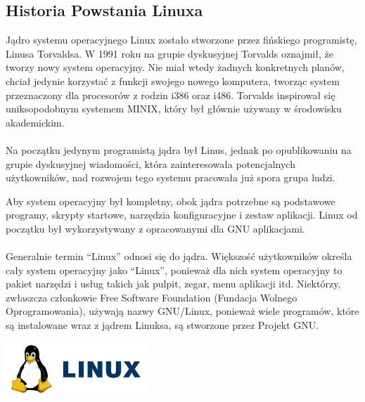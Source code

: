 \documentclass[10pt,a4paper]{report}
\begin{document}
\begin{adjustwidth}{2cm}{2cm}
\section{Historia Powstania Linuxa}
\begin{minipage}{1\linewidth}
Jądro systemu operacyjnego Linux zostało stworzone przez fińskiego programistę, Linusa Torvaldsa. W 1991 roku na grupie dyskusyjnej  Torvalds oznajmił, że tworzy nowy system operacyjny. Nie miał wtedy żadnych konkretnych planów, chciał jedynie korzystać z funkcji swojego nowego komputera, tworząc system przeznaczony dla procesorów z rodzin i386 oraz i486. Torvalds inspirował się uniksopodobnym systemem MINIX, który był głównie używany w środowisku akademickim. \\ \\
Na początku jedynym programistą jądra był Linus, jednak  po opublikowaniu na grupie dyskusyjnej wiadomości, która zainteresowała potencjalnych użytkowników, nad rozwojem tego systemu pracowała już spora grupa ludzi.
\end{minipage}
\begin{minipage}{1\linewidth}
Aby system operacyjny był kompletny, obok jądra potrzebne są  podstawowe programy, skrypty startowe, narzędzia konfiguracyjne i zestaw aplikacji. Linux od początku był wykorzystywany z opracowanymi dla GNU aplikacjami. \\ \\
Generalnie termin “Linux” odnosi się do jądra. Większość użytkowników określa cały system operacyjny jako  “Linux”, ponieważ dla nich system operacyjny to pakiet narzędzi i usług takich jak pulpit, zegar, menu aplikacji itd. Niektórzy, zwłaszcza członkowie Free Software Foundation (Fundacja Wolnego Oprogramowania), używają nazwy GNU/Linux, ponieważ wiele programów, które są instalowane wraz z jądrem Linuksa, są stworzone przez Projekt GNU. 
\end{minipage}
 \begin{minipage}{\linewidth}
\begin{center}
  \includegraphics[width=200px]{img/linux-logo}
\end{center}
\end{minipage}
\begin{minipage}{1\linewidth}

\end{minipage}
\end{adjustwidth}
\end{document}
